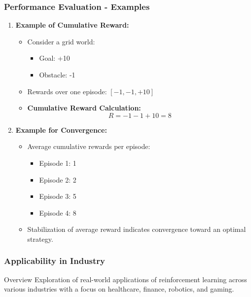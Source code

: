 \documentclass{beamer}
\begin{document}
\begin{frame}[fragile]
    \frametitle{Performance Evaluation - Examples}
    \begin{enumerate}
        \item \textbf{Example of Cumulative Reward:}
        \begin{itemize}
            \item Consider a grid world:
            \begin{itemize}
                \item Goal: +10 
                \item Obstacle: -1
            \end{itemize}
            \item Rewards over one episode: 
                \([-1, -1, +10]\) 
            \item \textbf{Cumulative Reward Calculation:}
            \begin{equation}
                R = -1 - 1 + 10 = 8
            \end{equation}
        \end{itemize}

        \item \textbf{Example for Convergence:}
        \begin{itemize}
            \item Average cumulative rewards per episode:
            \begin{itemize}
                \item Episode 1: 1
                \item Episode 2: 2
                \item Episode 3: 5
                \item Episode 4: 8
            \end{itemize}
            \item Stabilization of average reward indicates convergence toward an optimal strategy.
        \end{itemize}
    \end{enumerate}
\end{frame}

\begin{frame}[fragile]
    \frametitle{Applicability in Industry}
    \begin{block}{Overview}
        Exploration of real-world applications of reinforcement learning across various industries with a focus on healthcare, finance, robotics, and gaming.
    \end{block}
\end{frame}
\end{document}
